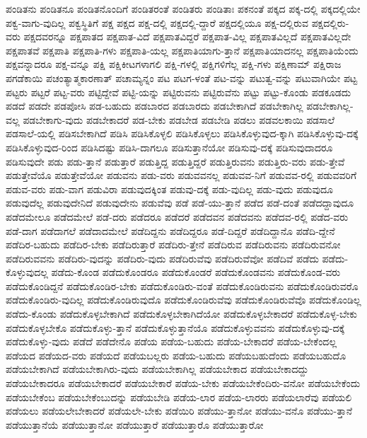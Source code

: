 {ಪಂಡಿತನು
ಪಂಡಿತನೂ
ಪಂಡಿತನೊಂದಿಗೆ
ಪಂಡಿತರಂತೆ
ಪಂಡಿತರು
ಪಂಡಿತಾಃ
ಪಕನಂತೆ
ಪಕ್ಕದ
ಪಕ್ಕ-ದಲ್ಲಿ
ಪಕ್ಕದಲ್ಲಿಯೇ
ಪಕ್ವ-ವಾಗು-ವುದಿಲ್ಲ
ಪಕ್ವಸ್ಥಿತಿಗೆ
ಪಕ್ಷ
ಪಕ್ಷದ
ಪಕ್ಷ-ದಲ್ಲಿ
ಪಕ್ಷದಲ್ಲಿ-ದ್ದಾರೆ
ಪಕ್ಷದಲ್ಲಿಯೂ
ಪಕ್ಷ-ದಲ್ಲಿರುವ
ಪಕ್ಷದಲ್ಲಿರು-ವರು
ಪಕ್ಷದವರನ್ನೂ
ಪಕ್ಷಪಾತದ
ಪಕ್ಷಪಾತ-ವಿದೆ
ಪಕ್ಷಪಾತವಿದ್ದರೆ
ಪಕ್ಷಪಾತ-ವಿಲ್ಲ
ಪಕ್ಷಪಾತವಿಲ್ಲದೆ
ಪಕ್ಷಪಾತವಿಲ್ಲದೇ
ಪಕ್ಷಪಾತವೆ
ಪಕ್ಷಪಾತಿ
ಪಕ್ಷಪಾತಿ-ಗಳು
ಪಕ್ಷಪಾತಿ-ಯಲ್ಲ
ಪಕ್ಷಪಾತಿಯಾಗು-ತ್ತಾನೆ
ಪಕ್ಷಪಾತಿಯಾದನಲ್ಲ
ಪಕ್ಷಪಾತಿಯೆಂದು
ಪಕ್ಷವನ್ನಾದರೂ
ಪಕ್ಷ-ವನ್ನೂ
ಪಕ್ಷಿ
ಪಕ್ಷಿಕೀಟಗಳಾಗಲಿ
ಪಕ್ಷಿ-ಗಳಲ್ಲಿ
ಪಕ್ಷಿಗಳಿಗೆಲ್ಲ
ಪಕ್ಷಿ-ಗಳು
ಪಕ್ಷಿಣಾಮ್
ಪಕ್ಷಿರಾಜ
ಪಗಡೆಕಾಯಿ
ಪಚಂತ್ಯಾತ್ಮಕಾರಣಾತ್
ಪಚಾಮ್ಯನ್ನಂ
ಪಟ
ಪಟಗ-ಳಂತೆ
ಪಟ-ವನ್ನು
ಪಟುತ್ವ-ವನ್ನು
ಪಟುವಾಗಿಯೇ
ಪಟ್ಟ
ಪಟ್ಟರು
ಪಟ್ಟರೆ
ಪಟ್ಟ-ವರು
ಪಟ್ಟಿದ್ದೇವೆ
ಪಟ್ಟಿ-ಯನ್ನು
ಪಟ್ಟಿರುವನು
ಪಟ್ಟಿರುವೆನು
ಪಟ್ಟು
ಪಟ್ಟು-ಕೊಂಡು
ಪಡಕೂಡದು
ಪಡದೆ
ಪಡದೇ
ಪಡಪೋಸಿ
ಪಡ-ಬಹುದು
ಪಡಬಾರದ
ಪಡಬಾರದು
ಪಡಬೇಕಾಗಿದೆ
ಪಡಬೇಕಾಗಿಲ್ಲ
ಪಡಬೇಕಾಗಿಲ್ಲ-ವಲ್ಲ
ಪಡಬೇಕಾಗು-ವುದು
ಪಡಬೇಕಾದರೆ
ಪಡ-ಬೇಕು
ಪಡಬೇಡ
ಪಡಬೇಡಿ
ಪಡಲು
ಪಡವಲಕಾಯಿ
ಪಡಸಾಲೆ
ಪಡಸಾಲೆ-ಯಲ್ಲಿ
ಪಡಿಸಬೇಕಾಗಿದೆ
ಪಡಿಸಿ
ಪಡಿಸಿಕೊಳ್ಳಲಿ
ಪಡಿಸಿಕೊಳ್ಳಲು
ಪಡಿಸಿಕೊಳ್ಳುವುದ-ಕ್ಕಾಗಿ
ಪಡಿಸಿಕೊಳ್ಳುವು-ದಕ್ಕೆ
ಪಡಿಸಿಕೊಳ್ಳುವುದ-ರಿಂದ
ಪಡಿಸಿದಷ್ಟು
ಪಡಿಸಿ-ದಾಗಲೂ
ಪಡಿಸುತ್ತಾನೆಯೋ
ಪಡಿಸುವು-ದಕ್ಕೆ
ಪಡಿಸುವುದಾದರೂ
ಪಡಿಸುವುದೇ
ಪಡು
ಪಡು-ತ್ತಾನೆ
ಪಡುತ್ತಾರೆ
ಪಡುತ್ತಿದ್ದ
ಪಡುತ್ತಿದ್ದರೆ
ಪಡುತ್ತಿರುವನು
ಪಡುತ್ತಿರು-ವರು
ಪಡು-ತ್ತೇವೆ
ಪಡುತ್ತೇವೆಯೊ
ಪಡುತ್ತೇವೆಯೋ
ಪಡುವನು
ಪಡು-ವರು
ಪಡುವವನಲ್ಲ
ಪಡುವವ-ನಿಗೆ
ಪಡುವವ-ರಲ್ಲಿ
ಪಡುವವರಿಗೆ
ಪಡುವ-ವರು
ಪಡು-ವಾಗ
ಪಡುವಿರಾ
ಪಡುವುದಕ್ಕಿಂತ
ಪಡುವು-ದಕ್ಕೆ
ಪಡು-ವುದಿಲ್ಲ
ಪಡು-ವುದು
ಪಡುವುದೂ
ಪಡುವುದೆಲ್ಲ
ಪಡುವುದೇನಿದೆ
ಪಡುವುದೇನು
ಪಡುವೆವು
ಪಡೆ
ಪಡೆ-ಯು-ತ್ತಾನೆ
ಪಡೆದ
ಪಡೆ-ದಂತೆ
ಪಡೆದದ್ದಾವುದೂ
ಪಡೆದಮೇಲೂ
ಪಡೆದಮೇಲೆ
ಪಡೆ-ದರು
ಪಡೆದರೂ
ಪಡೆದರೆ
ಪಡೆದವನ
ಪಡೆದವನು
ಪಡೆದವ-ರಲ್ಲಿ
ಪಡೆದ-ವರು
ಪಡೆ-ದಾಗ
ಪಡೆದಾಗಲೆ
ಪಡೆದಾದಮೇಲೆ
ಪಡೆದಿದ್ದನು
ಪಡೆದಿದ್ದರೂ
ಪಡೆ-ದಿದ್ದರೆ
ಪಡೆದಿದ್ದಾನೊ
ಪಡೆದಿ-ದ್ದೇನೆ
ಪಡೆದಿರ-ಬಹುದು
ಪಡೆದಿರ-ಬೇಕು
ಪಡೆದಿರುತ್ತಾರೆ
ಪಡೆದಿರು-ತ್ತೇನೆ
ಪಡೆದಿರುವ
ಪಡೆದಿರುವನು
ಪಡೆದಿರುವನೋ
ಪಡೆದಿರುವವನು
ಪಡೆದಿರು-ವುದನ್ನು
ಪಡೆದಿರು-ವುದು
ಪಡೆದಿರುವೆವು
ಪಡೆದಿರುವೆವೋ
ಪಡೆದಿವೆ
ಪಡೆದು
ಪಡೆದು-ಕೊಳ್ಳುವುದಲ್ಲ
ಪಡೆದು-ಕೊಂಡ
ಪಡೆದುಕೊಂಡರೂ
ಪಡೆದುಕೊಂಡರೆ
ಪಡೆದುಕೊಂಡವನು
ಪಡೆದುಕೊಂಡ-ವರು
ಪಡೆದುಕೊಂಡಿದ್ದನೆ
ಪಡೆದುಕೊಂಡಿರ-ಬೇಕು
ಪಡೆದುಕೊಂಡಿರು-ವಂತೆ
ಪಡೆದುಕೊಂಡಿರುವನು
ಪಡೆದುಕೊಂಡಿರುವರೊ
ಪಡೆದುಕೊಂಡಿರು-ವುದಿಲ್ಲ
ಪಡೆದುಕೊಂಡಿರುವುದೊ
ಪಡೆದುಕೊಂಡಿರುವೆವು
ಪಡೆದುಕೊಂಡಿರುವೆವೊ
ಪಡೆದುಕೊಂಡಿಲ್ಲ
ಪಡೆದು-ಕೊಂಡು
ಪಡೆದುಕೊಳ್ಳಬೇಕಾಗಿದೆ
ಪಡೆದುಕೊಳ್ಳಬೇಕಾಗಿದೆಯೋ
ಪಡೆದುಕೊಳ್ಳಬೇಕಾದರೆ
ಪಡೆದುಕೊಳ್ಳ-ಬೇಕು
ಪಡೆದುಕೊಳ್ಳಬೇಕೊ
ಪಡೆದುಕೊಳ್ಳು-ತ್ತಾನೆ
ಪಡೆದುಕೊಳ್ಳುತ್ತಾನೆಯೊ
ಪಡೆದುಕೊಳ್ಳುವವನು
ಪಡೆದುಕೊಳ್ಳುವು-ದಕ್ಕೆ
ಪಡೆದುಕೊಳ್ಳು-ವುದು
ಪಡೆದೆ
ಪಡೆದೇನೊ
ಪಡೆಯ
ಪಡೆಯ-ಬಹುದು
ಪಡೆಯ-ಬೇಕಾದರೆ
ಪಡೆಯ-ಬೇಕೆಂದಲ್ಲ
ಪಡೆಯದ
ಪಡೆಯದ-ವರು
ಪಡೆಯದೆ
ಪಡೆಯಬಲ್ಲರು
ಪಡೆಯ-ಬಹುದು
ಪಡೆಯಬಹುದೆಂದು
ಪಡೆಯಬಹುದೊ
ಪಡೆಯಬೇಕಾಗಿದೆ
ಪಡೆಯಬೇಕಾಗಿರು-ವುದು
ಪಡೆಯಬೇಕಾಗಿಲ್ಲ
ಪಡೆಯಬೇಕಾದ
ಪಡೆಯಬೇಕಾದದ್ದು
ಪಡೆಯಬೇಕಾದರೂ
ಪಡೆಯಬೇಕಾದರೆ
ಪಡೆಯಬೇಕಾರೆ
ಪಡೆಯ-ಬೇಕು
ಪಡೆಯಬೇಕೆಂದಿರು-ವನೋ
ಪಡೆಯಬೇಕೆಂದು
ಪಡೆಯಬೇಕೆಂಬ
ಪಡೆಯಬೇಕೆಂಬುದನ್ನು
ಪಡೆಯಬೇಡಿ
ಪಡೆಯ-ಲಾರ
ಪಡೆಯ-ಲಾರರು
ಪಡೆಯಲಾರೆವು
ಪಡೆಯಲಿ
ಪಡೆಯಲು
ಪಡೆಯಲೇಬೇಕಾದರೆ
ಪಡೆಯಲೇ-ಬೇಕು
ಪಡೆಯಿರಿ
ಪಡೆಯು-ತ್ತಾನೋ
ಪಡೆಯು-ವನೊ
ಪಡೆಯು-ತ್ತಾನೆ
ಪಡೆಯುತ್ತಾನೆಯೆ
ಪಡೆಯುತ್ತಾನೋ
ಪಡೆಯುತ್ತಾರೆ
ಪಡೆಯುತ್ತಾರೊ
ಪಡೆಯುತ್ತಾರೋ
}
